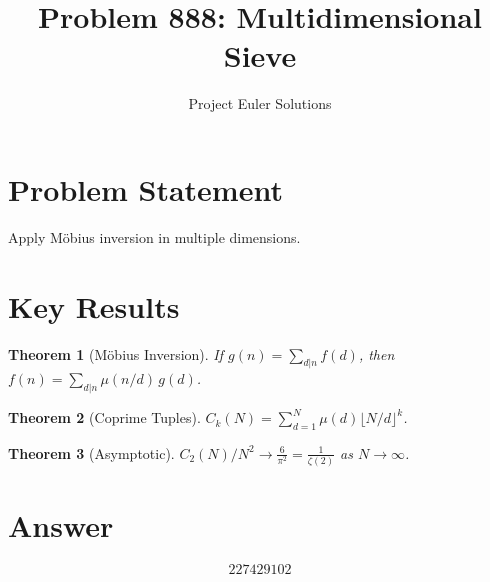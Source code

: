 \documentclass[11pt]{article}
\title{Problem 888: Multidimensional Sieve}
\author{Project Euler Solutions}
\date{}
\newtheorem{theorem}{Theorem}
\begin{document}
\maketitle

\section{Problem Statement}
Apply M\"obius inversion in multiple dimensions.

\section{Key Results}

\begin{theorem}[M\"obius Inversion]
If $g(n) = \sum_{d|n} f(d)$, then $f(n) = \sum_{d|n} \mu(n/d)\,g(d)$.
\end{theorem}

\begin{theorem}[Coprime Tuples]
$C_k(N) = \sum_{d=1}^{N} \mu(d)\lfloor N/d\rfloor^k$.
\end{theorem}

\begin{theorem}[Asymptotic]
$C_2(N)/N^2 \to \frac{6}{\pi^2} = \frac{1}{\zeta(2)}$ as $N \to \infty$.
\end{theorem}

\section{Answer}

\[
\boxed{227429102}
\]
\end{document}

